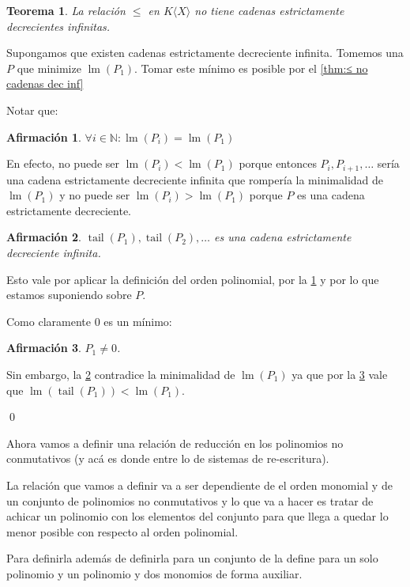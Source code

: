 \documentclass[12pt]{report}
\theoremstyle{customstyle}
\newtheorem{theorem}{Teorema}[chapter]
\renewenvironment{proof}[1][\proofname]{{\bfseries #1: }}{\qed} %
\theoremstyle{factstyle}
\newtheorem{fact}{Afirmación}[theorem]
\DeclareMathOperator{\lm}{lm}
\DeclareMathOperator{\tail}{tail}
\begin{document}
\begin{theorem}\label{thm:≤ en KX no cadenas dec inf}
  La relación $≤$ en $K⟨X⟩$ no tiene cadenas estrictamente decrecientes infinitas.
\end{theorem}
\begin{proof}
  Supongamos que existen cadenas estrictamente decreciente infinita. Tomemos una $P$ que minimize $\lm(P_1)$. Tomar este mínimo es posible por el \cref{thm:≤ no cadenas dec inf}

  Notar que:

  \begin{fact}\label{fact:≤ en KX no cadenas dec inf:1}
    $∀i ∈ ℕ : \lm(P_i) = \lm(P_1)$
  \end{fact}
  En efecto, no puede ser $\lm(P_i) < \lm(P_1)$ porque entonces $P_i, P_{i + 1}, …$ sería una cadena estrictamente decreciente infinita que rompería la minimalidad de $\lm(P_1)$ y no puede ser $\lm(P_i) > \lm(P_1)$ porque $P$ es una cadena estrictamente decreciente.

  \begin{fact}\label{fact:≤ en KX no cadenas dec inf:2}
    $\tail(P_1), \tail(P_2), …$ es una cadena estrictamente decreciente infinita.
  \end{fact}
  Esto vale por aplicar la definición del orden polinomial, por la \cref{fact:≤ en KX no cadenas dec inf:1} y por lo que estamos suponiendo sobre $P$.

  Como claramente $0$ es un mínimo:

  \begin{fact}\label{fact:≤ en KX no cadenas dec inf:3}
    $P_1 ≠ 0$.
  \end{fact}

  Sin embargo, la \cref{fact:≤ en KX no cadenas dec inf:2} contradice la minimalidad de $\lm(P_1)$ ya que por la \cref{fact:≤ en KX no cadenas dec inf:3} vale que $\lm(\tail(P_1)) < \lm(P_1)$.

\end{proof}

Ahora vamos a definir una relación de reducción en los polinomios no conmutativos (y acá es donde entre lo de sistemas de re-escritura).

La relación que vamos a definir va a ser dependiente de el orden monomial y de un conjunto de polinomios no conmutativos y lo que va a hacer es tratar de achicar un polinomio con los elementos del conjunto para que llega a quedar lo menor posible con respecto al orden polinomial.

Para definirla además de definirla para un conjunto de la define para un solo polinomio y un polinomio y dos monomios de forma auxiliar.
\end{document}
